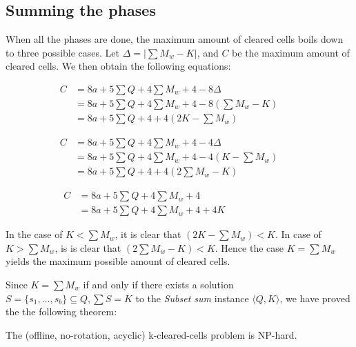 \subsection{Summing the phases}

When all the phases are done, the maximum amount of cleared cells boils down to three possible cases. Let $\Delta = |\sum M_w - K|$, and $C$ be the maximum amount of cleared cells. We then obtain the following equations:

\begin{equation} \tag{$K < \sum M_w$}
\begin{split}
C & = 8a + 5 \sum Q + 4 \sum M_w + 4 - 8 \Delta  \\
& = 8a + 5 \sum Q + 4 \sum M_w + 4 - 8 \left( \sum M_w - K\right) \phantom{+ 4K} \\
& = 8a + 5 \sum Q + 4 + 4 \left(2K - \sum M_w \right)
\end{split}
\end{equation}

\begin{equation} \tag{$K > \sum M_w$}
\begin{split}
C & = 8a + 5 \sum Q + 4 \sum M_w + 4 - 4 \Delta \\
& = 8a + 5 \sum Q + 4 \sum M_w + 4 - 4 \left( K - \sum M_w \right) \phantom{+ 4K} \\
& = 8a + 5 \sum Q + 4 + 4 \left(2 \sum M_w - K \right)
\end{split}
\end{equation}

\begin{equation} \tag{$K = \sum M_w$}
\begin{split}
C & = 8a + 5 \sum Q + 4 \sum M_w + 4 \phantom{- 8 \Delta} \\
& = 8a + 5 \sum Q + 4 \sum M_w + 4 + 4K \phantom{8 \left(\sum M_w + K \right)}
\end{split}
\end{equation}

In the case of $K < \sum M_w$, it is clear that $\left(2K - \sum M_w \right) < K$. In case of $K > \sum M_w$, is is clear that $\left(2 \sum M_w - K \right) < K$. Hence the case $K = \sum M_w$ yields the maximum possible amount of cleared cells.

Since $K = \sum M_w$ if and only if there exists a solution $S = \{s_1, \ldots, s_b \} \subseteq Q, \sum S = K$ to the \textit{Subset sum} instance $\langle Q, K \rangle$, we have proved the the following theorem: \\

\begin{thm}
\label{thm:nphard}
The (offline, no-rotation, acyclic) k-cleared-cells problem is NP-hard.
\end{thm}
